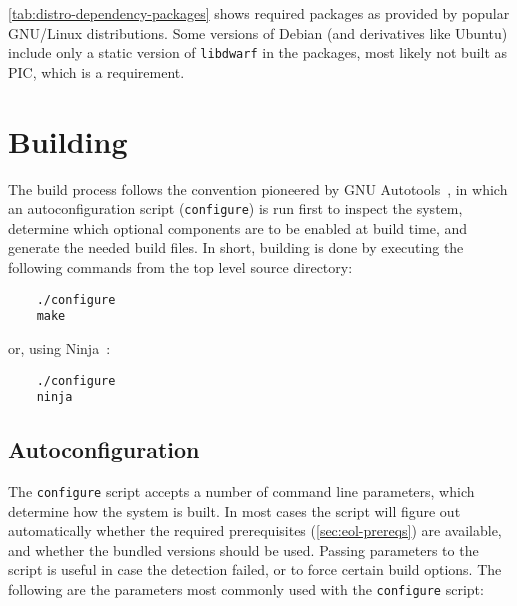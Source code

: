 \autoref{tab:distro-dependency-packages} shows required packages as provided
by popular GNU/Linux distributions. Some versions of Debian (and derivatives
like Ubuntu) include only a static version of \verb|libdwarf| in the packages,
most likely not built as \gls{PIC}, which is a requirement.


\section{Building}

The build process follows the convention pioneered by GNU
Autotools~\cite{autotools-history}, in which an autoconfiguration script
(\verb|configure|) is run first to inspect the system, determine which
optional components are to be enabled at build time, and generate the needed
build files. In short, building \Eol* is done by executing the following
commands from the top level source directory:

\begin{verbatim}
	./configure
	make
\end{verbatim}

or, using Ninja~\cite{ninja-manual}:

\begin{verbatim}
	./configure
	ninja
\end{verbatim}


\subsection{Autoconfiguration}
  \label{sec:running-configure}

The \verb|configure| script accepts a number of command line parameters, which
determine how the system is built. In most cases the script will figure out
automatically whether the required prerequisites (\autoref{sec:eol-prereqs})
are available, and whether the bundled versions should be used. Passing
parameters to the script is useful in case the detection failed, or to force
certain build options.  The following are the parameters most commonly used
with the \verb|configure| script:

